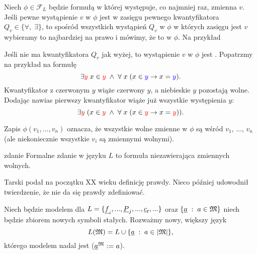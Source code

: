 Niech $\phi\in \mathcal{F}_L$ będzie formułą w której występuje, co najmniej raz, zmienna $v$. Jeśli pewne wystąpienie $v$ w $\phi$ jest w zasięgu pewnego kwantyfikatora $Q_v\in\{\forall,\;\exists\}$, to spośród wszystkich wystąpień $Q_v$ w $\phi$ w których zasięgu jest $v$ wybieramy to najbardziej na prawo i mówimy, że to  w $\phi$. Na przykład
\begin{center}
\end{center}

Jeśli nie ma kwantyfikatora $Q_v$ jak wyżej, to wystąpienie $v$ w $\phi$ jest . Popatrzmy na przykład na formułę
$$\exists {\color{red}y}\;x\in {\color{red}y}\;\land\;\forall\;x\;(x\in {\color{blue}y}\to x={\color{blue}y}).$$
Kwantyfikator z czerwonym $y$ wiąże czerwony $y$, a niebieskie $y$ pozostają wolne. Dodając nawias pierwszy kwantyfikator wiąże już wszystkie występienia $y$:
$$\exists {\color{red}y}\;(x\in {\color{red}y}\;\land\;\forall\;x\;(x\in {\color{red}y}\to x={\color{red}y})).$$

\begin{konwencja}{}{}
  Zapis $\phi(v_1,...,v_n)$ oznacza, że wszystkie wolne zmienne w $\phi$ są wśród $v_1$, ..., $v_n$ (ale niekoniecznie wszystkie $v_i$ są zmiennymi wolnymi).
\end{konwencja}

\begin{definition}{zdanie}{}
  Formalne zdanie w języku $L$ to formuła niezawierająca zmiennych wolnych.
\end{definition}

Tarski podał na początku XX wieku definicję prawdy. Nieco później udowodnił twierdzenie, że nie da się prawdy zdefiniować.


Niech \Mm{} będzie modelem dla $L=\{\underline{f}_i,...,\underline{P}_j,...,\underline{c}_t,...\}$ oraz $\{\underline{a}\;:\;a\in \mathfrak{M}\}$ niech będzie zbiorem nowych symboli stałych. Rozważmy nowy, większy język 
$$L(\mathfrak{M})=L\cup \{\underline{a}\;:\;a\in |\mathfrak{M}|\},$$
którego modelem nadal jest \Mm{} ($\underline{a}^{\mathfrak{M}}:=a$).

